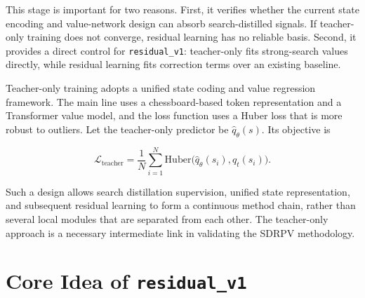 This stage is important for two reasons. First, it verifies whether the current state encoding and value-network design can absorb search-distilled signals. If teacher-only training does not converge, residual learning has no reliable basis. Second, it provides a direct control for \texttt{residual_v1}: teacher-only fits strong-search values directly, while residual learning fits correction terms over an existing baseline.



Teacher-only training adopts a unified state coding and value regression framework. The main line uses a chessboard-based token representation and a Transformer value model, and the loss function uses a Huber loss that is more robust to outliers. Let the teacher-only predictor be $\hat{q}_{\theta}(s)$. Its objective is

\begin{equation}
\mathcal{L}_{\mathrm{teacher}}
=
\frac{1}{N}\sum_{i=1}^{N}
\mathrm{Huber}\bigl(\hat{q}_{\theta}(s_i),q_t(s_i)\bigr).
\end{equation}

Such a design allows search distillation supervision, unified state representation, and subsequent residual learning to form a continuous method chain, rather than several local modules that are separated from each other. The teacher-only approach is a necessary intermediate link in validating the SDRPV methodology.

\section{Core Idea of \texttt{residual\_v1}}

